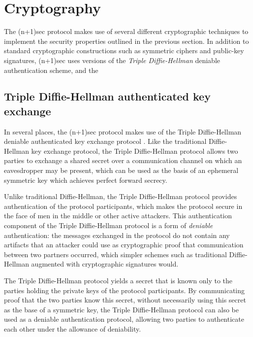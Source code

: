 \documentclass{article}
\begin{document}



\section{Cryptography}
\label{sec:cryptography}

The (n+1)sec protocol makes use of several different cryptographic techniques to implement the security properties outlined in the previous section.
In addition to standard cryptographic constructions such as symmetric ciphers and public-key signatures, (n+1)sec uses versions of the \emph{Triple Diffie-Hellman} deniable authentication scheme, and the 


\subsection{Triple Diffie-Hellman authenticated key exchange}
\label{sec:cryptography/triple-diffie-hellman}

In several places, the (n+1)sec protocol makes use of the Triple Diffie-Hellman deniable authenticated key exchange protocol \cite{tdh}.
Like the traditional Diffie-Hellman key exchange protocol, the Triple Diffie-Hellman protocol allows two parties to exchange a shared secret over a communication channel on which an eavesdropper may be present, which can be used as the basis of an ephemeral symmetric key which achieves perfect forward secrecy.

Unlike traditional Diffie-Hellman, the Triple Diffie-Hellman protocol provides authentication of the protocol participants, which makes the protocol secure in the face of men in the middle or other active attackers.
This authentication component of the Triple Diffie-Hellman protocol is a form of \emph{deniable} authentication: the messages exchanged in the protocol do not contain any artifacts that an attacker could use as cryptographic proof that communication between two partners occurred, which simpler schemes such as traditional Diffie-Hellman augmented with cryptographic signatures would.

The Triple Diffie-Hellman protocol yields a secret that is known only to the parties holding the private keys of the protocol participants.
By communicating proof that the two parties know this secret, without necessarily using this secret as the base of a symmetric key, the Triple Diffie-Hellman protocol can also be used as a deniable authentication protocol, allowing two parties to authenticate each other under the allowance of deniability.
\end{document}
